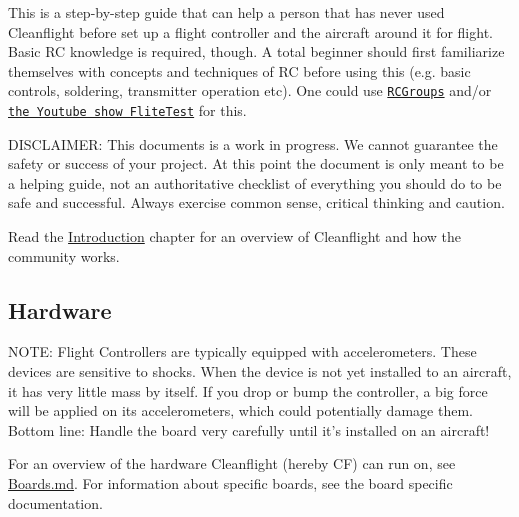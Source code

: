 This is a step-\/by-\/step guide that can help a person that has never used Cleanflight before set up a flight controller and the aircraft around it for flight. Basic R\+C knowledge is required, though. A total beginner should first familiarize themselves with concepts and techniques of R\+C before using this (e.\+g. basic controls, soldering, transmitter operation etc). One could use \href{http://www.rcgroups.com/forums/index.php}{\tt R\+C\+Groups} and/or \href{https://www.youtube.com/user/flitetest}{\tt the Youtube show Flite\+Test} for this.

D\+I\+S\+C\+L\+A\+I\+M\+E\+R\+: This documents is a work in progress. We cannot guarantee the safety or success of your project. At this point the document is only meant to be a helping guide, not an authoritative checklist of everything you should do to be safe and successful. Always exercise common sense, critical thinking and caution.

Read the \hyperlink{Introduction_8md}{Introduction} chapter for an overview of Cleanflight and how the community works.

\subsection*{Hardware}

N\+O\+T\+E\+: Flight Controllers are typically equipped with accelerometers. These devices are sensitive to shocks. When the device is not yet installed to an aircraft, it has very little mass by itself. If you drop or bump the controller, a big force will be applied on its accelerometers, which could potentially damage them. Bottom line\+: Handle the board very carefully until it's installed on an aircraft!

For an overview of the hardware Cleanflight (hereby C\+F) can run on, see \hyperlink{Boards_8md}{Boards.md}. For information about specific boards, see the board specific documentation.


